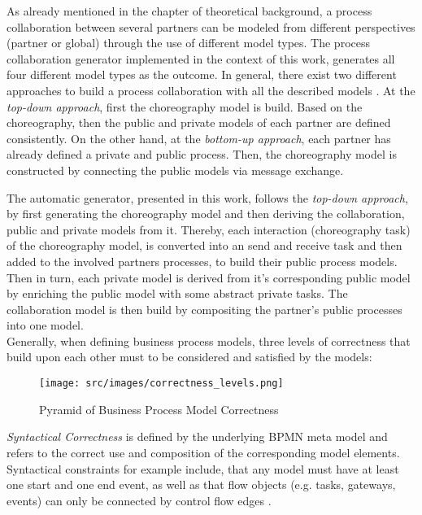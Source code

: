 As already mentioned in the chapter of theoretical background, a process collaboration between several partners can be modeled from different perspectives (partner or global) through the use of different model types. The process collaboration generator implemented in the context of this work, generates all four different model types as the outcome. In general, there exist two different approaches to build a process collaboration with all the described models \cite{sabrina1174}. At the \textit{top-down approach}, first the choreography model is build. Based on the choreography, then the public and private models of each partner are defined consistently. On the other hand, at the \textit{bottom-up approach}, each partner has already defined a private and public process. Then, the choreography model is constructed by connecting the public models via message exchange. \par
The automatic generator, presented in this work, follows the \textit{top-down approach}, by first generating the choreography model and then deriving the collaboration, public and private models from it. Thereby, each interaction (choreography task) of the choreography model, is converted into an send and receive task and then added to the involved partners processes, to build their public process models. Then in turn, each private model is derived from it's corresponding public model by enriching the public model with some abstract private tasks. The collaboration model is then build by compositing the partner's public processes into one model.\\

Generally, when defining business process models, three levels of correctness that build upon each other must to be considered and satisfied by the models: \\

\begin{wrapfigure}{r}{0.5\textwidth}
\texttt{[image: src/images/correctness\_levels.png]}
\caption{Pyramid of Business Process Model Correctness}
\label{fig:bpm_correctness}
\end{wrapfigure}

\textit{Syntactical Correctness} is defined by the underlying BPMN meta model and refers to the correct use and composition of the corresponding model elements. Syntactical constraints for example include, that any model must have at least one start and one end event, as well as that flow objects (e.g. tasks, gateways, events) can only be connected by control flow edges \cite{sabrina848}. \\

